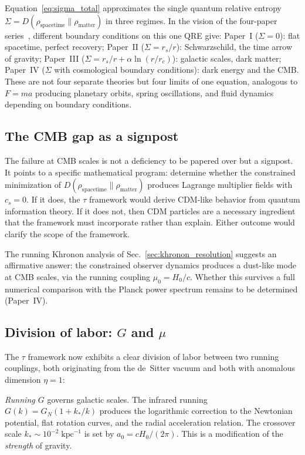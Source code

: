 \documentclass[prd,twocolumn,superscriptaddress,longbibliography,floatfix]{revtex4-2}
\newcommand{\KL}{D}
\newcommand{\tauasym}{\tau}
\begin{document}
Equation~\eqref{eq:sigma_total} approximates the single
quantum relative entropy
$\Sigma = \KL(\rho_{\mathrm{spacetime}} \|
\rho_{\mathrm{matter}})$ in three regimes.  In the vision of
the four-paper series~\cite{Paper1,Paper2,Paper5}, different
boundary conditions on this one QRE give:
Paper~I ($\Sigma = 0$): flat spacetime, perfect recovery;
Paper~II ($\Sigma = r_s/r$): Schwarzschild, the time arrow
of gravity;
Paper~III ($\Sigma = r_s/r + \alpha\ln(r/r_c)$):
galactic scales, dark matter;
Paper~IV ($\Sigma$ with cosmological boundary conditions):
dark energy and the CMB.
These are not four separate theories but four limits of one
equation, analogous to $F = ma$ producing planetary orbits,
spring oscillations, and fluid dynamics depending on
boundary conditions.

\subsection{The CMB gap as a signpost}

The failure at CMB scales is not a deficiency to be
papered over but a signpost.  It points to a specific
mathematical program: determine whether the constrained
minimization of
$\KL(\rho_{\mathrm{spacetime}} \| \rho_{\mathrm{matter}})$
produces Lagrange multiplier fields with $c_s = 0$.  If it
does, the $\tauasym$ framework would derive CDM-like behavior
from quantum information theory.  If it does not, then CDM
particles are a necessary ingredient that the framework must
incorporate rather than explain.  Either outcome would
clarify the scope of the framework.

The running Khronon analysis of Sec.~\ref{sec:khronon_resolution}
suggests an affirmative answer: the constrained observer
dynamics produces a dust-like mode at CMB scales, via the
running coupling $\mu_0 = H_0/c$.  Whether this survives a
full numerical comparison with the Planck power spectrum
remains to be determined (Paper~IV).

\subsection{Division of labor: $G$ and $\mu$}

The $\tauasym$ framework now exhibits a clear division of
labor between two running couplings, both originating from the
de~Sitter vacuum and both with anomalous dimension
$\eta = 1$:

\emph{Running $G$} governs galactic scales.  The infrared
running $G(k) = G_N(1 + k_*/k)$ produces the logarithmic
correction to the Newtonian potential, flat rotation curves,
and the radial acceleration relation.  The crossover scale
$k_* \sim 10^{-2}\;\mathrm{kpc}^{-1}$ is set by
$a_0 = cH_0/(2\pi)$.  This is a modification of the
\emph{strength} of gravity.
\end{document}
